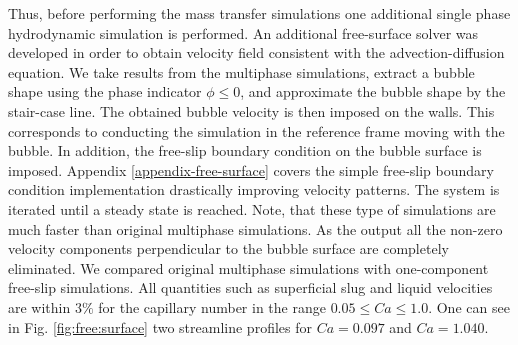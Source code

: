 \documentclass{article}
\begin{document}
\begin{description}
Thus, before performing the mass transfer simulations one additional single phase hydrodynamic
simulation is performed. An additional free-surface solver was developed in order to obtain velocity field
consistent with the advection-diffusion equation. We take results from the
multiphase simulations, extract a
bubble shape using the phase indicator $\phi\leq0$, and approximate the bubble shape by the stair-case
line. The obtained bubble velocity is then imposed on the walls. This corresponds to conducting the
simulation in the reference frame moving with the bubble. In addition, the free-slip boundary
condition on the bubble surface is imposed. Appendix \ref{appendix-free-surface} covers the simple
free-slip boundary condition implementation drastically improving velocity patterns. The system is
iterated until a
steady state is reached. Note, that these type of simulations are much faster than original
multiphase simulations. As the output all the non-zero velocity components perpendicular to the
bubble surface are completely eliminated. We compared original multiphase simulations with
one-component free-slip simulations. All quantities such as superficial slug and liquid velocities are
within $3\%$ for the capillary number in the range $0.05\leq Ca \leq 1.0$. 
One can see in Fig. \ref{fig:free:surface} two streamline profiles for $Ca=0.097$  and $Ca=1.040$.
\begin{figure}[htb!]

\end{figure}
\end{description}
\end{document}
